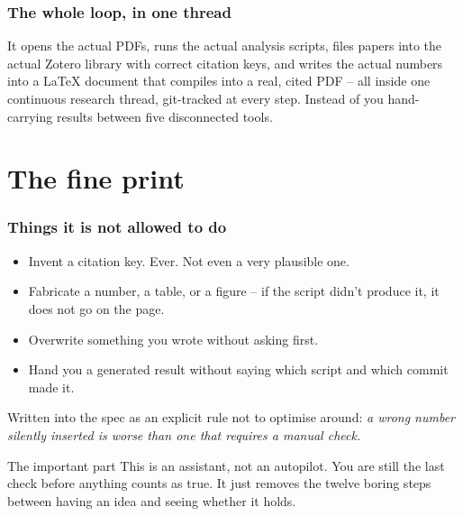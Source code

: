 \begin{frame}
\frametitle{The whole loop, in one thread}
\begin{center}
\end{center}
\vspace{2mm}
It opens the actual PDFs, runs the actual analysis scripts, files papers
into the actual Zotero library with correct citation keys, and writes the
actual numbers into a LaTeX document that compiles into a real, cited PDF
-- all inside one continuous research thread, git-tracked at every step.
\vspace{2mm}
Instead of you hand-carrying results between five disconnected tools.
\end{frame}

\section{The fine print}

\begin{frame}
\frametitle{Things it is not allowed to do}
\begin{itemize}
    \item Invent a citation key. Ever. Not even a very plausible one.
    \item Fabricate a number, a table, or a figure -- if the script
          didn't produce it, it does not go on the page.
    \item Overwrite something you wrote without asking first.
    \item Hand you a generated result without saying which script and
          which commit made it.
\end{itemize}
\vspace{2mm}
Written into the spec as an explicit rule not to optimise around:
\emph{a wrong number silently inserted is worse than one that requires a
manual check.}
\begin{block}{The important part}
This is an assistant, not an autopilot. You are still the last check
before anything counts as true. It just removes the twelve boring steps
between having an idea and seeing whether it holds.
\end{block}
\end{frame}

